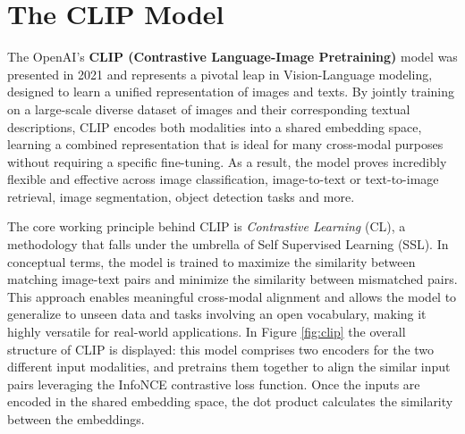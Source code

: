 \documentclass[a4paper, oneside, english]{sapthesis} %
\begin{document}



\chapter{The CLIP Model} %

The OpenAI's \textbf{CLIP (Contrastive Language-Image Pretraining)} model \cite{radford2021learning} was presented in 2021 and represents a pivotal leap in Vision-Language modeling, designed to learn a unified representation of images and texts. By jointly training on a large-scale diverse dataset of images and their corresponding textual descriptions, CLIP encodes both modalities into a shared embedding space, learning a combined representation that is ideal for many cross-modal purposes without requiring a specific fine-tuning. As a result, the model proves incredibly flexible and effective across image classification, image-to-text or text-to-image retrieval, image segmentation, object detection tasks and more.

The core working principle behind CLIP is \emph{Contrastive Learning} (CL), a methodology that falls under the umbrella of Self Supervised Learning (SSL). In conceptual terms, the model is trained to maximize the similarity between matching image-text pairs and minimize the similarity between mismatched pairs. This approach enables meaningful cross-modal alignment and allows the model to generalize to unseen data and tasks involving an open vocabulary, making it highly versatile for real-world applications. In Figure \ref{fig:clip} the overall structure of CLIP is displayed: this model comprises two encoders for the two different input modalities, and pretrains them together to align the similar input pairs leveraging the InfoNCE contrastive loss function. Once the inputs are encoded in the shared embedding space, the dot product calculates the similarity between the embeddings.
\end{document}
